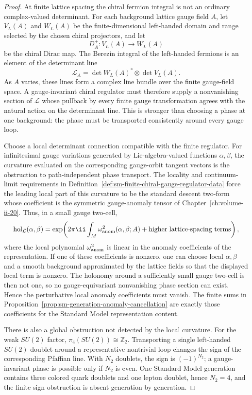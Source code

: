 \begin{proof}
At finite lattice spacing the chiral fermion integral is not an ordinary
complex-valued determinant.  For each background lattice gauge field \(A\),
let \(V_L(A)\) and \(W_L(A)\) be the finite-dimensional left-handed domain
and range selected by the chosen chiral projectors, and let
\[
  D_A^+:V_L(A)\longrightarrow W_L(A)
\]
be the chiral Dirac map.  The Berezin integral of the left-handed fermions is
an element of the determinant line
\[
  \mathcal L_A
  =
  \det W_L(A)^*\otimes \det V_L(A).
\]
As \(A\) varies, these lines form a complex line bundle over the finite
gauge-field space.  A gauge-invariant chiral regulator must therefore supply
a nonvanishing section of \(\mathcal L\) whose pullback by every finite gauge
transformation agrees with the natural action on the determinant line.  This
is stronger than choosing a phase at one background: the phase must be
transported consistently around every gauge loop.

Choose a local determinant connection compatible with the finite regulator.
For infinitesimal gauge variations generated by Lie-algebra-valued functions
\(\alpha,\beta\), the curvature evaluated on the corresponding gauge-orbit
tangent vectors is the obstruction to path-independent phase transport.
The locality and continuum-limit requirements in
Definition~\ref{def:sm-finite-chiral-gauge-regulator-data} force the leading
local part of this curvature to be the standard descent two-form whose
coefficient is the symmetric gauge-anomaly tensor of
Chapter~\ref{ch:volume-ii-20}.  Thus, in a small gauge two-cell,
\[
  \operatorname{hol}_{\mathcal L}(\alpha,\beta)
  =
  \exp\!\left(
    2\pi\ii
    \int_M \omega^2_{\rm anom}(\alpha,\beta;A)
    +\text{higher lattice-spacing terms}
  \right),
\]
where the local polynomial \(\omega^2_{\rm anom}\) is linear in the anomaly
coefficients of the representation.  If one of these coefficients is
nonzero, one can choose local \(\alpha,\beta\) and a smooth background
approximated by the lattice fields so that the displayed local term is
nonzero.  The holonomy around a sufficiently small gauge two-cell is then
not one, so no gauge-equivariant nonvanishing phase section can exist.  Hence
the perturbative local anomaly coefficients must vanish.  The finite sums in
Proposition~\ref{prop:sm-generation-anomaly-cancellation} are exactly those
coefficients for the Standard Model representation content.

There is also a global obstruction not detected by the local curvature.  For
the weak \(SU(2)\) factor, \(\pi_4(SU(2))\cong\mathbb Z_2\).  Transporting a
single left-handed \(SU(2)\) doublet around a representative nontrivial loop
changes the sign of the corresponding Pfaffian line.  With \(N_2\) doublets,
the sign is \((-1)^{N_2}\); a gauge-invariant phase is possible only if
\(N_2\) is even.  One Standard Model generation contains three colored quark
doublets and one lepton doublet, hence \(N_2=4\), and the finite sign
obstruction is absent generation by generation.
\end{proof}

